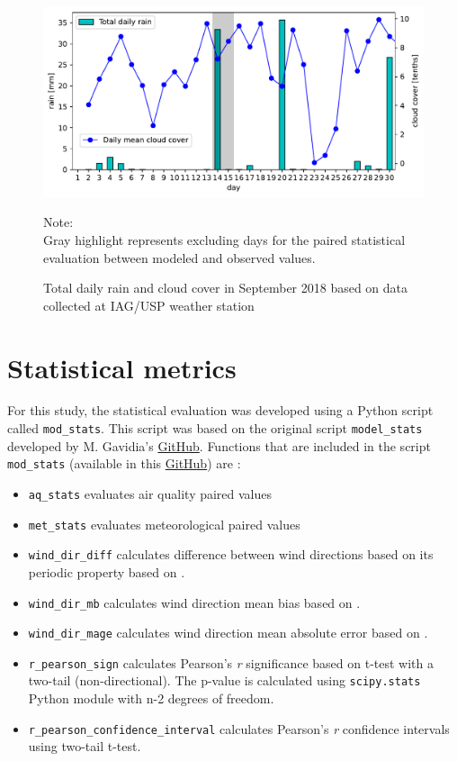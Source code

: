   	\begin{figure}
  		\includegraphics[width=1\textwidth]{fig/rain_cc.pdf}
  		\caption{Total daily rain and cloud cover in September 2018 based on data collected at IAG/USP weather station}
  		{\scriptsize Note:\\ Gray highlight represents excluding days for the paired statistical evaluation between modeled and observed values.}
  		\label{fig:rain_sep18}
  	\end{figure}
		

%
%

 \chapter{Statistical metrics}\label{ap04}
 For this study, the statistical evaluation was developed using a Python script called \verb|mod_stats|.
  This script was based on the original script \verb|model_stats| developed by M. Gavidia's \href{https://github.com/quishqa/WRF-Chem_SP/tree/master/wrf_sp_eval}{GitHub}.
  Functions that are included in the script \verb|mod_stats| (available in this \href{https://github.com/adelgadop/PythonWRF}{GitHub}) are :
  
  \begin{itemize}
  	\item \verb|aq_stats| evaluates air quality paired values
  	\item \verb|met_stats| evaluates meteorological paired values
  	\item \verb|wind_dir_diff| calculates difference between wind directions based on its periodic property based on \citet{Reboredo2015}.
  	\item \verb|wind_dir_mb| calculates wind direction mean bias based on \citet{Reboredo2015}.
  	\item \verb|wind_dir_mage| calculates wind direction mean absolute error based on \citet{Reboredo2015}.
  	\item \verb|r_pearson_sign| calculates Pearson's \textit{r} significance based on t-test with a two-tail (non-directional). The p-value is calculated using \verb|scipy.stats| Python module with n-2 degrees of freedom.
  	\item \verb|r_pearson_confidence_interval| calculates Pearson's \textit{r} confidence intervals using two-tail t-test.
  \end{itemize}
 
